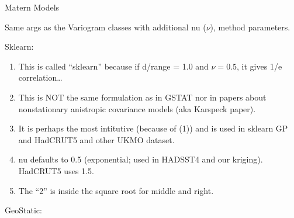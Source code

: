 \documentclass[letterpaper,10pt,english]{sphinxmanual}
\begin{document}

\begin{fulllineitems}
\label{\detokenize{covariance:glomar_gridding.variogram.MaternVariogram}}
\pysigstartsignatures
\pysiglinewithargsret
{}
{\sphinxparamcomma {}\sphinxparamcomma {}\sphinxparamcomma {}\sphinxparamcomma {}\sphinxparamcomma {}}
{}
\pysigstopsignatures
\sphinxAtStartPar
Matern Models

\sphinxAtStartPar
Same args as the Variogram classes with additional nu (\(\nu\)), method
parameters.

\sphinxAtStartPar
Sklearn:
\begin{enumerate}
%
\item {}
\sphinxAtStartPar
This is called “sklearn” because if d/range = 1.0 and \(\nu=0.5\), it
gives 1/e correlation…

\item {}
\sphinxAtStartPar
This is NOT the same formulation as in GSTAT nor in papers about
non\sphinxhyphen{}stationary anistropic covariance models (aka Karspeck paper).

\item {}
\sphinxAtStartPar
It is perhaps the most intitutive (because of (1)) and is used in sklearn
GP and HadCRUT5 and other UKMO dataset.

\item {}
\sphinxAtStartPar
nu defaults to 0.5 (exponential; used in HADSST4 and our kriging).
HadCRUT5 uses 1.5.

\item {}
\sphinxAtStartPar
The “2” is inside the square root for middle and right.

\end{enumerate}

\sphinxAtStartPar
GeoStatic:


\end{fulllineitems}
\end{document}
